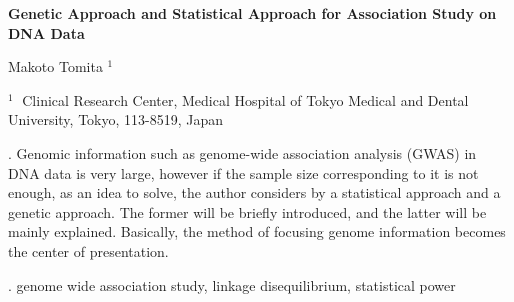 \documentclass[12pt]{article}
\begin{document}
\begin{flushleft}


{\LARGE\bf Genetic Approach and Statistical Approach for Association Study on DNA Data}


\vspace{1.0cm}

Makoto Tomita $^1$

\begin{description}

\item $^1 \;$ Clinical Research Center, Medical Hospital of Tokyo Medical and Dental University,
Tokyo, 113-8519, Japan

\end{description}

\end{flushleft}


\vspace{0.75cm}

. Genomic information such as genome-wide association analysis (GWAS) in DNA data is very large, however if the sample size corresponding to it is not enough, as an idea to solve, the author considers by a statistical approach and a genetic approach. The former will be briefly introduced, and the latter will be mainly explained. Basically, the method of focusing genome information becomes the center of presentation. 

\vskip 2mm

.
genome wide association study, linkage disequilibrium, statistical power


%        
%
%        
\end{document}
